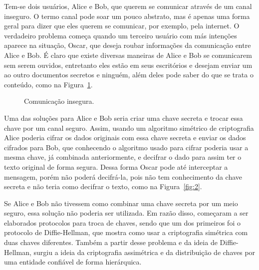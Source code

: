 \documentclass{article}
\begin{document}
Tem-se dois usuários, Alice e Bob, que querem se comunicar através de um canal
inseguro. O termo canal pode soar um pouco abstrato, mas é apenas uma forma
geral para dizer que eles querem se comunicar, por exemplo, pela internet. O
verdadeiro problema começa quando um terceiro usuário com más intenções aparece
na situação, Oscar, que deseja roubar informações da comunicação entre Alice e
Bob. É claro que existe diversas maneiras de Alice e Bob se comunicarem sem
serem ouvidos, entretanto eles estão em seus escritórios e desejam enviar um ao
outro documentos secretos e ninguém, além deles pode saber do que se trata o
conteúdo, como na Figura~\ref{fig:1}.

\begin{figure}[!ht]
  \centering
  \caption{Comunicação insegura.}\label{fig:1}
\end{figure}

Uma das soluções para Alice e Bob seria criar uma chave secreta e trocar essa
chave por um canal seguro. Assim, usando um algoritmo simétrico de criptografia
Alice poderia cifrar os dados originais com essa chave secreta e enviar os
dados cifrados para Bob, que conhecendo o algoritmo usado para cifrar poderia
usar a mesma chave, já combinada anteriormente, e decifrar o dado para assim
ter o texto original de forma segura. Dessa forma Oscar pode até interceptar a
mensagem, porém não poderá decifrá-la, pois não tem conhecimento da chave
secreta e não teria como decifrar o texto, como na Figura~\ref{fig:2}.

Se Alice e Bob não tivessem como combinar uma chave secreta por um meio seguro,
essa solução não poderia ser utilizada. Em razão disso, começaram a ser
elaborados protocolos para troca de chaves, sendo que um dos primeiros foi o
protocolo de Diffie-Hellman, que mostra como usar a criptografia simétrica com
duas chaves diferentes. Também a partir desse problema e da ideia de Diffie-
Hellman, surgiu a ideia da criptografia assimétrica e da distribuição de chaves
por uma entidade confiável de forma hierárquica.
\end{document}
